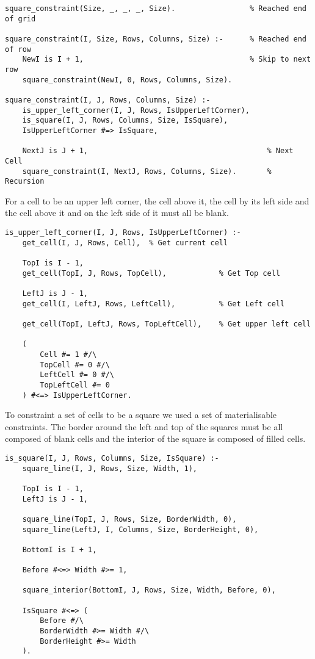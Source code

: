 \documentclass[runningheads]{llncs}
\begin{document}
\begin{verbatim}
square_constraint(Size, _, _, _, Size).                 % Reached end of grid

square_constraint(I, Size, Rows, Columns, Size) :-      % Reached end of row
    NewI is I + 1,                                      % Skip to next row
    square_constraint(NewI, 0, Rows, Columns, Size).

square_constraint(I, J, Rows, Columns, Size) :-
    is_upper_left_corner(I, J, Rows, IsUpperLeftCorner),    
    is_square(I, J, Rows, Columns, Size, IsSquare),         
    IsUpperLeftCorner #=> IsSquare,                         

    NextJ is J + 1,                                         % Next Cell
    square_constraint(I, NextJ, Rows, Columns, Size).       % Recursion
\end{verbatim}

For a cell to be an upper left corner, the cell above it, the cell by its left side and the cell above it and on the left side of it must all be blank.

\begin{verbatim}
is_upper_left_corner(I, J, Rows, IsUpperLeftCorner) :-
    get_cell(I, J, Rows, Cell),  % Get current cell                 

    TopI is I - 1,
    get_cell(TopI, J, Rows, TopCell),            % Get Top cell        
    
    LeftJ is J - 1,
    get_cell(I, LeftJ, Rows, LeftCell),          % Get Left cell      

    get_cell(TopI, LeftJ, Rows, TopLeftCell),    % Get upper left cell 

    (   
        Cell #= 1 #/\ 
        TopCell #= 0 #/\ 
        LeftCell #= 0 #/\ 
        TopLeftCell #= 0
    ) #<=> IsUpperLeftCorner.
\end{verbatim}

To constraint a set of cells to be a square we used a set of
materialisable constraints.
The border around the left and top of the squares must be all composed of blank cells and the interior of the square is composed of filled cells.

\begin{verbatim}
is_square(I, J, Rows, Columns, Size, IsSquare) :-
    square_line(I, J, Rows, Size, Width, 1),
    
    TopI is I - 1,
    LeftJ is J - 1,

    square_line(TopI, J, Rows, Size, BorderWidth, 0),
    square_line(LeftJ, I, Columns, Size, BorderHeight, 0),

    BottomI is I + 1,

    Before #<=> Width #>= 1,

    square_interior(BottomI, J, Rows, Size, Width, Before, 0), 

    IsSquare #<=> (
        Before #/\ 
        BorderWidth #>= Width #/\
        BorderHeight #>= Width 
    ).
\end{verbatim}
\end{document}
